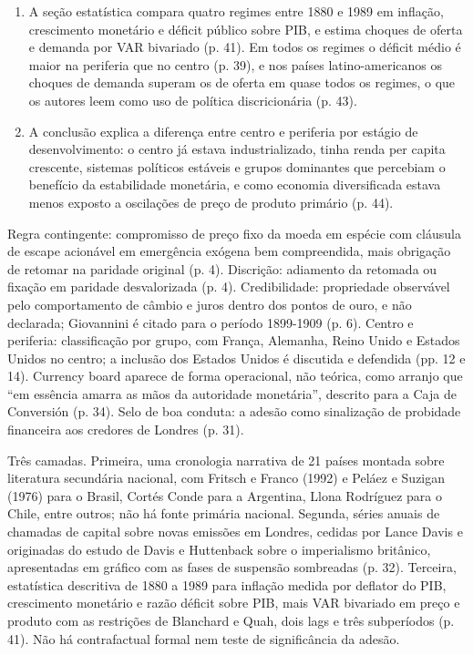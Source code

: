 \begin{enumerate}[leftmargin=*,nosep]
\item A seção estatística compara quatro regimes entre 1880 e 1989 em inflação,
crescimento monetário e déficit público sobre PIB, e estima choques de oferta e
demanda por VAR bivariado (p. 41). Em todos os regimes o déficit médio é maior na
periferia que no centro (p. 39), e nos países latino-americanos os choques de
demanda superam os de oferta em quase todos os regimes, o que os autores leem
como uso de política discricionária (p. 43).
\item A conclusão explica a diferença entre centro e periferia por estágio de
desenvolvimento: o centro já estava industrializado, tinha renda per capita
crescente, sistemas políticos estáveis e grupos dominantes que percebiam o benefício da
estabilidade monetária, e como economia diversificada estava menos exposto a
oscilações de preço de produto primário (p. 44).
\end{enumerate}

Regra contingente: compromisso de preço fixo da moeda em espécie com cláusula
de escape acionável em emergência exógena bem compreendida, mais obrigação de
retomar na paridade original (p. 4). Discrição: adiamento da retomada ou
fixação em paridade desvalorizada (p. 4). Credibilidade: propriedade observável
pelo comportamento de câmbio e juros dentro dos pontos de ouro, e não
declarada; Giovannini é citado para o período 1899-1909 (p. 6). Centro e
periferia: classificação por grupo, com França, Alemanha, Reino Unido e Estados
Unidos no centro; a inclusão dos Estados Unidos é discutida e defendida
(pp. 12 e 14). Currency board aparece de forma operacional, não teórica, como
arranjo que ``em essência amarra as mãos da autoridade monetária'', descrito
para a Caja de Conversión (p. 34). Selo de boa conduta: a adesão como
sinalização de probidade financeira aos credores de Londres (p. 31).


Três camadas. Primeira, uma cronologia narrativa de 21 países montada sobre
literatura secundária nacional, com Fritsch e Franco (1992) e Peláez e Suzigan
(1976) para o Brasil, Cortés Conde para a Argentina, Llona Rodríguez para o
Chile, entre outros; não há fonte primária nacional. Segunda, séries anuais de
chamadas de capital sobre novas emissões em Londres, cedidas por Lance Davis e
originadas do estudo de Davis e Huttenback sobre o imperialismo britânico,
apresentadas em gráfico com as fases de suspensão sombreadas (p. 32).
Terceira, estatística descritiva de 1880 a 1989 para inflação medida por
deflator do PIB, crescimento monetário e razão déficit sobre PIB, mais VAR
bivariado em preço e produto com as restrições de Blanchard e Quah, dois lags e
três subperíodos (p. 41). Não há contrafactual formal nem teste de
significância da adesão.

